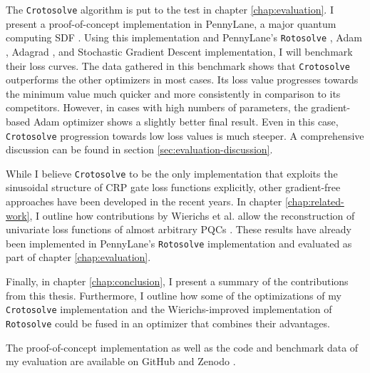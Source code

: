 The \texttt{Crotosolve} algorithm is put to the test in chapter
\ref{chap:evaluation}.
I present a proof-of-concept implementation in PennyLane, a major quantum
computing SDF \cite{bergholm_pennylane_2022}.
Using this implementation and PennyLane's
\texttt{Rotosolve} \cite{ostaszewski_structure_2021},
Adam \cite{kingma_adam_2017},
Adagrad \cite{duchi_adaptive_2011}, and
Stochastic Gradient Descent implementation, I will benchmark their loss curves.
The data gathered in this benchmark shows that \texttt{Crotosolve} outperforms
the other optimizers in most cases.
Its loss value progresses towards the minimum value much quicker and more
consistently in comparison to its competitors.
However, in cases with high numbers of parameters, the gradient-based Adam
optimizer shows a slightly better final result.
Even in this case, \texttt{Crotosolve} progression towards low loss values is
much steeper. 
A comprehensive discussion can be found in section
\ref{sec:evaluation-discussion}.

While I believe \texttt{Crotosolve} to be the only implementation that exploits
the sinusoidal structure of CRP gate loss functions explicitly, other
gradient-free approaches have been developed in the recent years.
In chapter \ref{chap:related-work}, I outline how contributions by
Wierichs et al. allow the reconstruction of univariate loss functions of almost
arbitrary PQCs \cite{wierichs_general_2022}.
These results have already been implemented in PennyLane's \texttt{Rotosolve}
implementation and evaluated as part of chapter \ref{chap:evaluation}.

Finally, in chapter \ref{chap:conclusion}, I present a summary of the
contributions from this thesis.
Furthermore, I outline how some of the optimizations of my \texttt{Crotosolve}
implementation and the Wierichs-improved implementation of \texttt{Rotosolve}
could be fused in an optimizer that combines their advantages.

The proof-of-concept implementation as well as the code and benchmark data of my
evaluation are available on GitHub and Zenodo \cite{crotosolve}.




